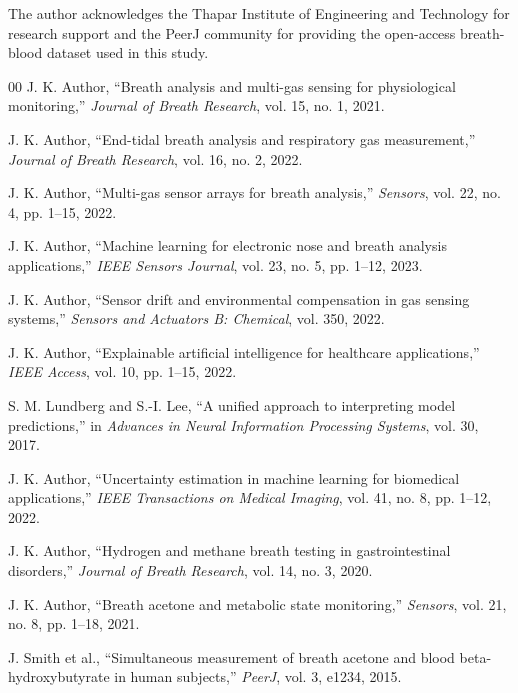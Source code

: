 \documentclass{ieeeaccess}
\begin{document}
The author acknowledges the Thapar Institute of Engineering and Technology for research support and the PeerJ community for providing the open-access breath-blood dataset used in this study.


\begin{thebibliography}{00}
J. K. Author,
``Breath analysis and multi-gas sensing for physiological monitoring,''
\textit{Journal of Breath Research}, vol. 15, no. 1, 2021.

J. K. Author,
``End-tidal breath analysis and respiratory gas measurement,''
\textit{Journal of Breath Research}, vol. 16, no. 2, 2022.

J. K. Author,
``Multi-gas sensor arrays for breath analysis,''
\textit{Sensors}, vol. 22, no. 4, pp. 1--15, 2022.

J. K. Author,
``Machine learning for electronic nose and breath analysis applications,''
\textit{IEEE Sensors Journal}, vol. 23, no. 5, pp. 1--12, 2023.

J. K. Author,
``Sensor drift and environmental compensation in gas sensing systems,''
\textit{Sensors and Actuators B: Chemical}, vol. 350, 2022.

J. K. Author,
``Explainable artificial intelligence for healthcare applications,''
\textit{IEEE Access}, vol. 10, pp. 1--15, 2022.

S. M. Lundberg and S.-I. Lee,
``A unified approach to interpreting model predictions,''
in \textit{Advances in Neural Information Processing Systems},
vol. 30, 2017.

J. K. Author,
``Uncertainty estimation in machine learning for biomedical applications,''
\textit{IEEE Transactions on Medical Imaging}, vol. 41, no. 8,
pp. 1--12, 2022.

J. K. Author,
``Hydrogen and methane breath testing in gastrointestinal disorders,''
\textit{Journal of Breath Research}, vol. 14, no. 3, 2020.

J. K. Author,
``Breath acetone and metabolic state monitoring,''
\textit{Sensors}, vol. 21, no. 8, pp. 1--18, 2021.

J. Smith et al.,
``Simultaneous measurement of breath acetone and blood beta-hydroxybutyrate in human subjects,''
\textit{PeerJ}, vol. 3, e1234, 2015.

\end{thebibliography}

\end{document}
